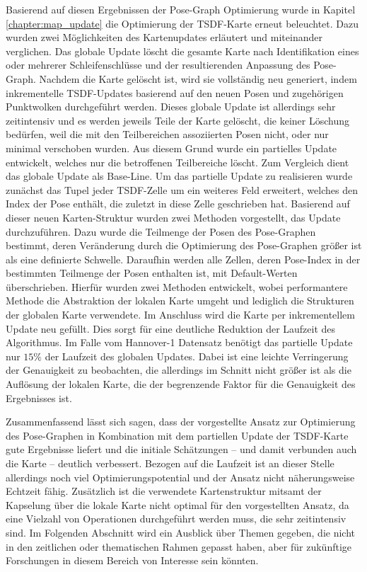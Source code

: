 Basierend auf diesen Ergebnissen der Pose-Graph Optimierung wurde in Kapitel \ref{chapter:map_update} die Optimierung der TSDF-Karte erneut beleuchtet. Dazu wurden zwei Möglichkeiten des Kartenupdates erläutert und miteinander verglichen. Das globale Update löscht die gesamte Karte nach Identifikation eines oder mehrerer Schleifenschlüsse und der resultierenden Anpassung des Pose-Graph. Nachdem die Karte gelöscht ist, wird sie vollständig neu generiert, indem inkrementelle TSDF-Updates basierend auf den neuen Posen und zugehörigen Punktwolken durchgeführt werden. Dieses globale Update ist allerdings sehr zeitintensiv und es werden jeweils Teile der Karte gelöscht, die keiner Löschung bedürfen, weil die mit den Teilbereichen assoziierten Posen nicht, oder nur minimal verschoben wurden. Aus diesem Grund wurde ein partielles Update entwickelt, welches nur die betroffenen Teilbereiche löscht. Zum Vergleich dient das globale Update als Base-Line. Um das partielle Update zu realisieren wurde zunächst das Tupel jeder TSDF-Zelle um ein weiteres Feld erweitert, welches den Index der Pose enthält, die zuletzt in diese Zelle geschrieben hat. Basierend auf dieser neuen Karten-Struktur wurden zwei Methoden vorgestellt, das Update durchzuführen. Dazu wurde die Teilmenge der Posen des Pose-Graphen bestimmt, deren Veränderung durch die Optimierung des Pose-Graphen größer ist als eine definierte Schwelle. Daraufhin werden alle Zellen, deren Pose-Index in der bestimmten Teilmenge der Posen enthalten ist, mit Default-Werten überschrieben. Hierfür wurden zwei Methoden entwickelt, wobei performantere Methode die Abstraktion der lokalen Karte umgeht und lediglich die Strukturen der globalen Karte verwendete. Im Anschluss wird die Karte per inkrementellem Update neu gefüllt. Dies sorgt für eine deutliche Reduktion der Laufzeit des Algorithmus. Im Falle vom Hannover-1 Datensatz benötigt das partielle Update nur $15\%$ der Laufzeit des globalen Updates. Dabei ist eine leichte Verringerung der Genauigkeit zu beobachten, die allerdings im Schnitt nicht größer ist als die Auflösung der lokalen Karte, die der begrenzende Faktor für die Genauigkeit des Ergebnisses ist.


Zusammenfassend lässt sich sagen, dass der vorgestellte Ansatz zur Optimierung des Pose-Graphen in Kombination mit dem partiellen Update der TSDF-Karte gute Ergebnisse liefert und die initiale Schätzungen -- und damit verbunden auch die Karte -- deutlich verbessert. Bezogen auf die Laufzeit ist an dieser Stelle allerdings noch viel Optimierungspotential und der Ansatz nicht näherungsweise Echtzeit fähig. Zusätzlich ist die verwendete Kartenstruktur mitsamt der Kapselung über die lokale Karte nicht optimal für den vorgestellten Ansatz, da eine Vielzahl von Operationen durchgeführt werden muss, die sehr zeitintensiv sind. Im Folgenden Abschnitt wird ein Ausblick über Themen gegeben, die nicht in den zeitlichen oder thematischen Rahmen gepasst haben, aber für zukünftige Forschungen in diesem Bereich von Interesse sein könnten.

